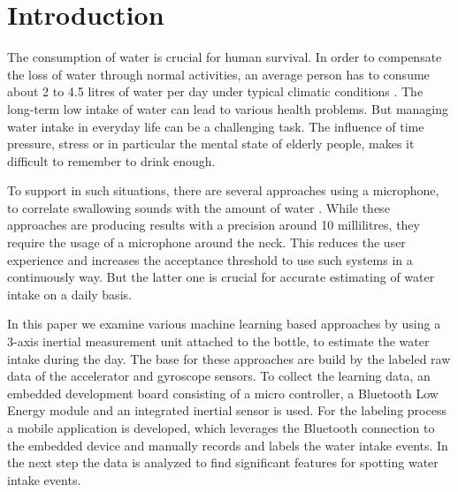 \section{Introduction}
The consumption of water is crucial for human survival. In order to compensate the loss of water through normal activities, an average person has to consume about 2 to 4.5 litres of water per day under typical climatic conditions \cite{doi:10.1080/02508069608686494}. The long-term low intake of water can lead to various health problems. But managing water intake in everyday life can be a challenging task. The influence of time pressure, stress or in particular the mental state of elderly people, makes it difficult to remember to drink enough.

To support in such situations, there are several approaches using a microphone, to correlate swallowing sounds with the amount of water \cite{7031280,8229307}. While these approaches are producing results with a precision around 10 millilitres, they require the usage of a microphone around the neck. This reduces the user experience and increases the acceptance threshold to use such systems in a continuously way. But the latter one is crucial for accurate estimating of water intake on a daily basis. 

In this paper we examine various machine learning based approaches by using a 3-axis inertial measurement unit attached to the bottle, to estimate the water intake during the day. The base for these approaches are build by the labeled raw data of the accelerator and gyroscope sensors. To collect the learning data, an embedded development board consisting of a micro controller, a Bluetooth Low Energy module and an integrated inertial sensor is used. For the labeling process a mobile application is developed, which leverages the Bluetooth connection to the embedded device and manually records and labels the water intake events. In the next step the data is analyzed to find significant features for spotting water intake events.